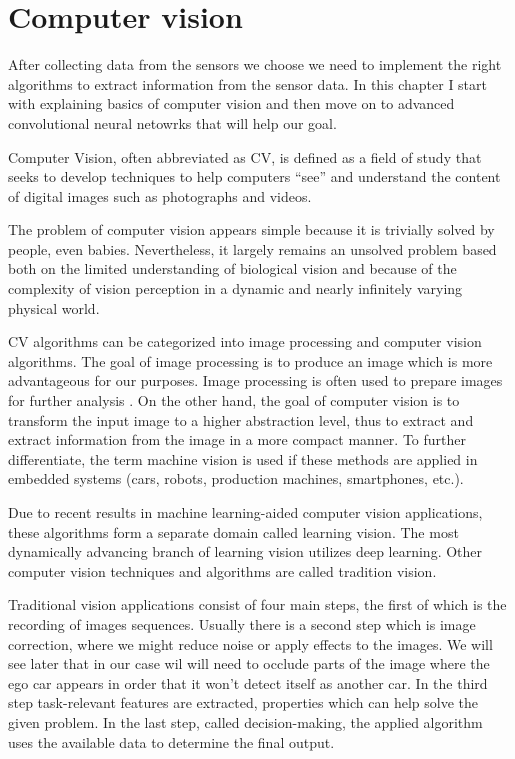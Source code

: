 \chapter{Computer vision}
\label{chap:perceptions}

After collecting data from the sensors we choose we need to implement the right
algorithms to extract information from the sensor data. In this chapter I start
with explaining basics of computer vision and then move on to advanced
convolutional neural netowrks that will help our goal.

Computer Vision, often abbreviated as CV, is defined as a field of study that
seeks to develop techniques to help computers “see” and understand the content
of digital images such as photographs and videos.

The problem of computer vision appears simple because it is trivially solved by
people, even babies. Nevertheless, it largely remains an unsolved
problem based both on the limited understanding of biological vision and because
of the complexity of vision perception in a dynamic and nearly infinitely
varying physical world.

CV algorithms can be categorized into image processing and computer vision
algorithms. The goal of image processing is to produce an image which is more
advantageous for our purposes. Image processing is often used to prepare images
for further analysis . On the other hand, the goal of computer vision is to
transform the input image to a higher abstraction level, thus to extract and
extract information from the image in a more compact manner. To further
differentiate, the term machine vision is used if these methods are applied in
embedded systems (cars, robots, production machines, smartphones, etc.).

Due to recent results in machine learning-aided computer vision applications,
these algorithms form a separate domain called learning vision. The most
dynamically advancing branch of learning vision utilizes deep learning. Other
computer vision techniques and algorithms are called tradition vision.

Traditional vision applications consist of four main steps, the first of which
is the recording of images sequences. Usually there is a second step which is
image correction, where we might reduce noise or apply effects to the images. We
will see later that in our case wil will need to occlude parts of the image
where the ego car appears in order that it won't detect itself as another car.
In the third step task-relevant features are extracted, properties which can
help solve the given problem. In the last step, called decision-making, the
applied algorithm uses the available data to determine the final output.

